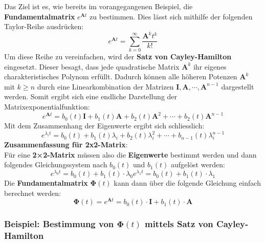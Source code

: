 Das Ziel ist es, wie bereits im vorangegangenen Beispiel, die \textbf{Fundamentalmatrix}
$e^{\bm{A}t}$ zu bestimmen. Dies lässt sich mithilfe der folgenden Taylor-Reihe ausdrücken:
$$ e^{\bm{A} t} = \sum\limits_{k=0}^{\infty} \frac{\bm{A}^k t^k}{k!} $$
Um diese Reihe zu vereinfachen, wird der \textbf{Satz von Cayley-Hamilton} eingesetzt. Dieser besagt,
dass jede quadratische Matrix $\bm{A}^k$ ihr eigenes charakteristisches Polynom erfüllt. Dadurch können
alle höheren Potenzen $\bm{A}^k$ mit $ k \geq n $ durch eine Linearkombination der Matrizen
$\bm{I},\bm{A}, \cdots, \bm{A}^{n-1}$ dargestellt werden.
\vspace{0.2cm}
Somit ergibt sich eine endliche Darstellung der Matrixexponentialfunktion:
$$ e^{\bm{A}t} = b_0(t)\bm{I} + b_1(t)\bm{A} + b_2(t)\bm{A}^2 + \cdots + b_2(t)\bm{A}^{n-1} $$
Mit dem Zusammenhang der Eigenwerte ergibt sich schliesslich:
$$ e^{\lambda_i t} = b_0(t) + b_1(t)\lambda_i + b_2(t)\lambda_i^2 + \cdots + b_{n-1}(t)\lambda_i^{n-1} $$
\textbf{Zusammenfassung für 2x2-Matrix}:\\
Für eine \textbf{2×2-Matrix} müssen also die \textbf{Eigenwerte} bestimmt werden und dann 
folgendes Gleichungssystem nach $b_0(t)$ und $b_1(t)$ aufgelöst werden:
$$ e^{\lambda_0 t} = b_0(t) + b_1(t) \cdot \lambda_0e^{\lambda_1t} = b_0(t) + b_1(t) \cdot \lambda_1$$
Die \textbf{Fundamentalmatrix} $\bm{\Phi}(t)$ kann dann über die folgende Gleichung einfach berechnet werden:
$$ \bm{\Phi}(t) = e^{\bm{A}t} = b_0(t) \cdot \bm{I} + b_1(t) \cdot \bm{A} $$

\subsubsection*{Beispiel: Bestimmung von $\bm{\Phi}(t)$ mittels Satz von Cayley-Hamilton}

